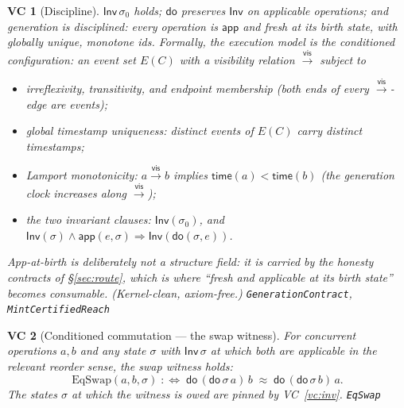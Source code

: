 \documentclass[11pt]{article}
\newtheorem{vc}{VC}
\newcommand{\vis}{\xrightarrow{\mathsf{vis}}}
\newcommand{\lean}[1]{\texttt{#1}}
\newcommand{\st}{\sigma}
\newcommand{\ini}{\st_0}
\newcommand{\dodo}{\mathsf{do}}
\newcommand{\eqobs}{\approx}
\newcommand{\Inv}{\mathsf{Inv}}
\newcommand{\app}{\mathsf{app}}
\begin{document}
\begin{vc}[Discipline]\label{vc:disc}
$\Inv\,\ini$ holds; $\dodo$ preserves $\Inv$ on applicable operations; and generation is
disciplined: every operation is $\app$ and \emph{fresh} at its birth state, with globally
unique, monotone ids. Formally, the execution model is the \emph{conditioned
configuration}: an event set $E(C)$ with a visibility relation $\vis$ subject to
\begin{itemize}[leftmargin=2em]
\item[(i)] irreflexivity, transitivity, and endpoint membership (both ends of every
  $\vis$-edge are events);
\item[(ii)] global timestamp uniqueness: distinct events of $E(C)$ carry distinct
  timestamps;
\item[(iii)] Lamport monotonicity: $a \vis b$ implies
  $\mathsf{time}(a) < \mathsf{time}(b)$ (the generation clock increases along
  $\vis$);
\item[(iv)] the two invariant clauses: $\Inv(\ini)$, and
  $\Inv(\st) \wedge \app(e, \st) \Rightarrow \Inv(\dodo(\st, e))$.
\end{itemize}
App-at-birth is deliberately \emph{not} a structure field: it is carried by the
honesty contracts of \S\ref{sec:route}, which is where ``fresh and applicable at its
birth state'' becomes consumable. (Kernel-clean, axiom-free.)
\hfill\lean{GenerationContract}, \lean{MintCertifiedReach}
\end{vc}

\begin{vc}[Conditioned commutation --- the swap witness]\label{vc:comm}
For concurrent operations $a,b$ and any state $\st$ with $\Inv\,\st$ at which both are
applicable in the relevant reorder sense, the \emph{swap witness} holds:
\[
  \mathrm{EqSwap}(a, b, \st) \;:\Longleftrightarrow\;
  \dodo\,(\dodo\,\st\,a)\,b \;\eqobs\; \dodo\,(\dodo\,\st\,b)\,a .
\]
The states $\st$ at which the witness is owed are pinned by VC~\ref{vc:inv}.
\hfill\lean{EqSwap}
\end{vc}
\end{document}
